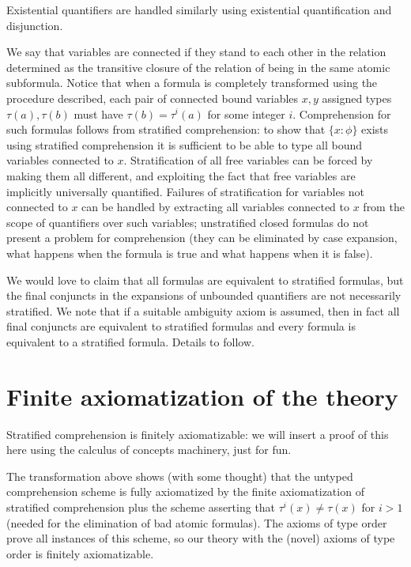 \documentclass[12pt]{article}
\begin{document}
Existential quantifiers are handled similarly using existential quantification and disjunction.

We say that variables are connected if they stand to each other in the relation determined as the transitive closure of the relation of being in the same atomic subformula.  Notice that when a formula is completely transformed using the procedure described, each pair of connected bound variables $x,y$ assigned types $\tau(a), \tau(b)$ must have
$\tau(b) = \tau^i(a)$ for some integer $i$.  Comprehension for such formulas follows from stratified comprehension:  to show that $\{x:\phi\}$ exists using stratified comprehension it is sufficient to be able to type all bound variables connected to $x$.  Stratification of all free variables can be forced by making them all different, and exploiting the fact
that free variables are implicitly universally quantified.   Failures of stratification for variables not connected to $x$ can be handled by extracting all variables connected to $x$ from the scope of quantifiers over such variables; unstratified closed formulas do not present a problem for comprehension (they can be eliminated by case expansion, what happens when the formula is true and what happens when it is false). 

We would love to claim that all formulas are equivalent to stratified formulas, but the final conjuncts in the expansions of unbounded quantifiers are not necessarily stratified.  We note that if a suitable ambiguity axiom is assumed, then in fact all final conjuncts are equivalent to stratified formulas and every formula is equivalent to a stratified formula.  Details to follow.


\section{Finite axiomatization of the theory}

Stratified comprehension is finitely axiomatizable:  we will insert a proof of this here using the calculus of concepts machinery, just for fun.

The transformation above shows (with some thought) that the untyped comprehension scheme is fully axiomatized by the finite axiomatization of stratified comprehension plus the scheme asserting that $\tau^i(x) \neq \tau(x)$ for $i>1$ (needed for the elimination of bad atomic formulas).  The axioms of type order prove all instances of this scheme,
so our theory with the (novel) axioms of type order is finitely axiomatizable.
\end{document}
